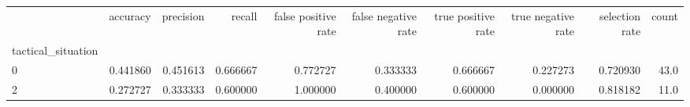 \begin{tabular}{lrrrrrrrrr}
\toprule
{} &  accuracy &  precision &    recall &  false positive rate &  false negative rate &  true positive rate &  true negative rate &  selection rate &  count \\
tactical\_situation &           &            &           &                      &                      &                     &                     &                 &        \\
\midrule
0                  &  0.441860 &   0.451613 &  0.666667 &             0.772727 &             0.333333 &            0.666667 &            0.227273 &        0.720930 &   43.0 \\
2                  &  0.272727 &   0.333333 &  0.600000 &             1.000000 &             0.400000 &            0.600000 &            0.000000 &        0.818182 &   11.0 \\
\bottomrule
\end{tabular}
